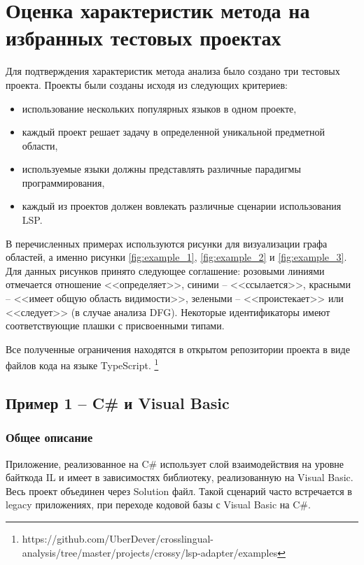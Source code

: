 \chapter{Оценка характеристик метода на избранных тестовых проектах}

Для подтверждения характеристик метода анализа было создано три тестовых проекта.
Проекты были созданы исходя из следующих критериев:
\begin{itemize}
    \item использование нескольких популярных языков в одном проекте,
    \item каждый проект решает задачу в определенной уникальной предметной области,
    \item используемые языки должны представлять различные парадигмы программирования,
    \item каждый из проектов должен вовлекать различные сценарии использования LSP.
\end{itemize}

В перечисленных примерах используются рисунки для визуализации графа областей, а именно рисунки \ref{fig:example_1}, \ref{fig:example_2} и \ref{fig:example_3}.
Для данных рисунков принято следующее соглашение: розовыми линиями отмечается отношение <<определяет>>, синими -- <<ссылается>>, красными -- <<имеет
общую область видимости>>, зелеными -- <<проистекает>> или <<следует>> (в случае анализа DFG).
Некоторые идентификаторы имеют соответствующие плашки с присвоенными типами.

Все полученные ограничения находятся в открытом репозитории проекта в виде файлов кода на языке TypeScript. \footnote{https://github.com/UberDever/crosslingual-analysis/tree/master/projects/crossy/lsp-adapter/examples}

\section{Пример 1 -- C\# и Visual Basic}

\subsection{Общее описание}

Приложение, реализованное на C\# использует слой взаимодействия на уровне байткода IL и имеет в зависимостях библиотеку,
реализованную на Visual Basic. Весь проект объединен через Solution файл. Такой сценарий часто встречается
в legacy приложениях, при переходе кодовой базы с Visual Basic на C\#.

